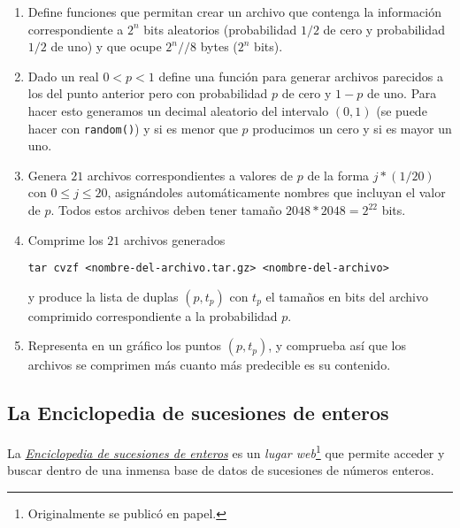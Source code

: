 \begin{ejer}
	\begin{enumerate}
		\item Define funciones que permitan crear un archivo que contenga  la informaci\'on correspondiente a $2^n$ bits aleatorios (probabilidad $1/2$ de cero y probabilidad $1/2$ de uno) y que ocupe $2^n//8$ bytes ($2^n$ bits). 
		
		\item Dado un real $0<p<1$ define una funci\'on para generar archivos parecidos a los del punto anterior pero con probabilidad $p$ de cero y $1-p$ de uno. Para hacer esto generamos un decimal aleatorio del intervalo $(0,1)$ (se puede hacer con {\tt random()}) y si es menor que $p$ producimos un cero y si es mayor un uno. 
		
		  \item Genera $21$ archivos correspondientes a valores de $p$ de la forma $j*(1/20)$ con $0\le j\le 20$, asign\'andoles autom\'aticamente nombres que incluyan el valor de $p$. Todos estos archivos deben tener  tama\~no $2048*2048=2^{22}$ bits.
		  
		  \item  Comprime los $21$ archivos generados 
		  \begin{center}
		  \verb|tar cvzf <nombre-del-archivo.tar.gz> <nombre-del-archivo>|
		  \end{center}
		  y produce la lista de duplas $(p,t_p)$ con $t_p$ el  tama\~nos en bits del archivo comprimido correspondiente a la probabilidad $p$.
		  
		  \item Representa en un gr\'afico los puntos $(p,t_p)$, y comprueba as\'{i} que {\sc los archivos se comprimen m\'as cuanto m\'as predecible es su contenido.} 
		
		  
	\end{enumerate}
	
\end{ejer}




\subsection{La Enciclopedia de sucesiones de enteros}

La \href{https://oeis.org/}{{\itshape  Enciclopedia de sucesiones de enteros}}
es un {\itshape lugar web}\footnote{Originalmente se public\'o en papel.} que
permite acceder y buscar dentro de una inmensa base de datos de sucesiones de
n\'umeros enteros. 

